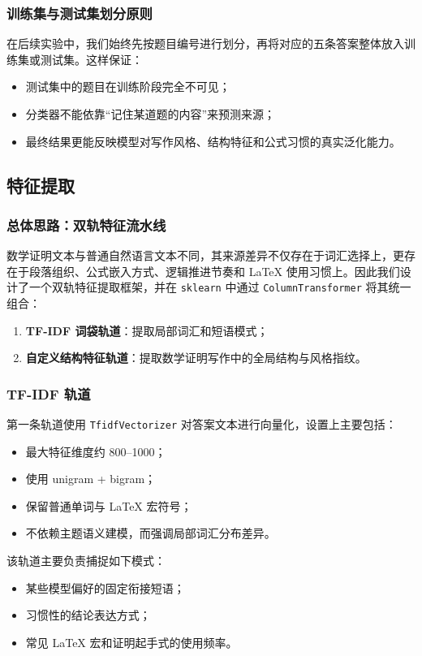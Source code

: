 \documentclass[11pt, a4paper]{ctexart}
\begin{document}
\subsubsection{训练集与测试集划分原则}
在后续实验中，我们始终先按题目编号进行划分，再将对应的五条答案整体放入训练集或测试集。这样保证：
\begin{itemize}
    \item 测试集中的题目在训练阶段完全不可见；
    \item 分类器不能依靠“记住某道题的内容”来预测来源；
    \item 最终结果更能反映模型对写作风格、结构特征和公式习惯的真实泛化能力。
\end{itemize}

\subsection{特征提取}

\subsubsection{总体思路：双轨特征流水线}
数学证明文本与普通自然语言文本不同，其来源差异不仅存在于词汇选择上，更存在于段落组织、公式嵌入方式、逻辑推进节奏和 LaTeX 使用习惯上。因此我们设计了一个双轨特征提取框架，并在 \texttt{sklearn} 中通过 \texttt{ColumnTransformer} 将其统一组合：
\begin{enumerate}
    \item \textbf{TF-IDF 词袋轨道}：提取局部词汇和短语模式；
    \item \textbf{自定义结构特征轨道}：提取数学证明写作中的全局结构与风格指纹。
\end{enumerate}

\subsubsection{TF-IDF 轨道}
第一条轨道使用 \texttt{TfidfVectorizer} 对答案文本进行向量化，设置上主要包括：
\begin{itemize}
    \item 最大特征维度约 800--1000；
    \item 使用 unigram + bigram；
    \item 保留普通单词与 LaTeX 宏符号；
    \item 不依赖主题语义建模，而强调局部词汇分布差异。
\end{itemize}

该轨道主要负责捕捉如下模式：
\begin{itemize}
    \item 某些模型偏好的固定衔接短语；
    \item 习惯性的结论表达方式；
    \item 常见 LaTeX 宏和证明起手式的使用频率。
\end{itemize}
\end{document}

